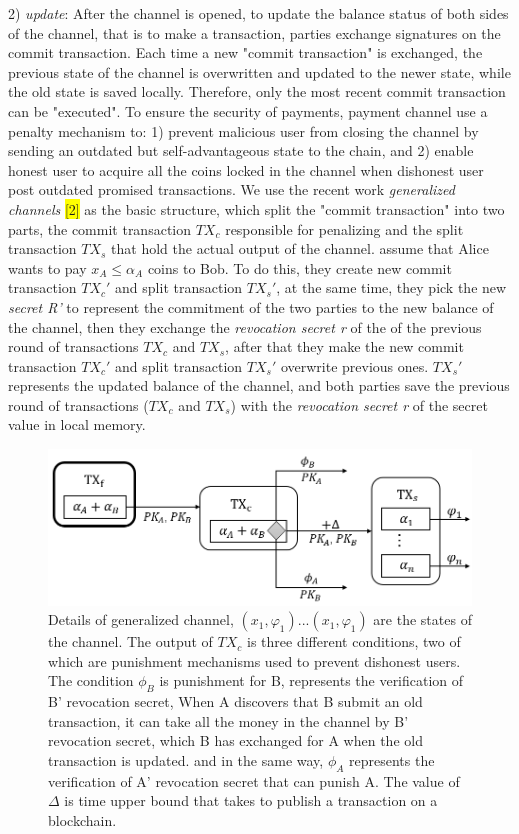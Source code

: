 \documentclass[conference]{IEEEtran}
\begin{document}
2) \emph{update}: After the channel is opened, to update the balance status of both sides of the channel, that is to make a transaction, parties exchange signatures on the commit transaction. Each time a new "commit transaction" is exchanged, the previous state of the channel is overwritten and updated to the newer state, while the old state is saved locally. Therefore, only the most recent commit transaction 
can be "executed". To ensure the security of payments, payment channel use a penalty mechanism to: 1) prevent malicious user from closing the channel by sending an outdated but self-advantageous state to the chain, and 2) enable honest user to acquire all the coins locked in the channel when dishonest user post outdated promised transactions. We use the recent work \emph{generalized channels} \colorbox{yellow}{[2]} 
as the basic structure, which split the "commit transaction" into two parts, the commit transaction $TX_c$ responsible for penalizing and the split transaction $TX_s$ that hold the actual output of the channel. assume that Alice wants to pay $x_A \leq \alpha_A$ coins to Bob. To do this, they create new commit transaction $TX_c'$ and split transaction $TX_s'$, at the same time, they pick the new \emph{secret R'} 
to represent the commitment of the two parties to the new balance of the channel, then they exchange the \emph{revocation secret r} of the of the previous round of transactions $TX_c$ and $TX_s$, after that they make the new commit transaction $TX_c'$ and split transaction $TX_s'$ overwrite previous ones. $TX_s'$ represents the updated balance of the channel, and both parties save the previous round of transactions ($TX_c$ and $TX_s$) with the \emph{revocation secret r} of the secret value in local memory.

\begin{figure}[t]
	\centering
	\includegraphics[scale=0.45]{fig3.png}
	\caption{Details of generalized channel, $(x_1,\varphi_1)...(x_1,\varphi_1)$ are the states of the channel. The output of $TX_c$ 
		is three different conditions, two of which are punishment mechanisms used to prevent dishonest users. The condition $\phi_B$ is
		punishment for B, represents the verification of B’ revocation secret, When A discovers that B submit an old transaction, it can 
		take all the money in the channel by B' revocation secret, which B has exchanged for A when the old transaction is updated.
		and in the same way, $\phi_A$ represents the verification of A’ revocation secret that can punish A. The value of $\Delta$ is time upper 
		bound that takes to publish a transaction on a blockchain.
	}
\end{figure}
\end{document}
